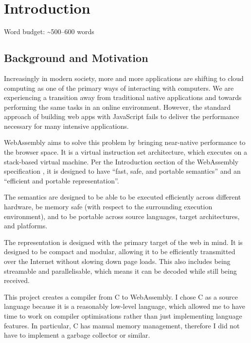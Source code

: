 \documentclass[00-main.tex]{subfiles}
\begin{document}
\chapter{Introduction}

\begin{mrwComment}
Word budget: \textasciitilde500--600 words
\end{mrwComment}

\section{Background and Motivation}

Increasingly in modern society, more and more applications are shifting to cloud computing as one of the primary ways of interacting with computers.
We are experiencing a transition away from traditional native applications and towards performing the same tasks in an online environment.
However, the standard approach of building web apps with JavaScript fails to deliver the performance necessary for many intensive applications.

WebAssembly aims to solve this problem by bringing near-native performance to the browser space.
It is a virtual instruction set architecture, which executes on a stack-based virtual machine.
Per the Introduction section of the WebAssembly specification , it is designed to have ``fast, safe, and portable semantics'' and an ``efficient and portable representation''.

The semantics are designed to be able to be executed efficiently across different hardware, be memory safe (with respect to the surrounding execution environment), and to be portable across source languages, target architectures, and platforms.

The representation is designed with the primary target of the web in mind.
It is designed to be compact and modular, allowing it to be efficiently transmitted over the Internet without slowing down page loads.
This also includes being streamable and parallelisable, which means it can be decoded while still being received.

This project creates a compiler from C to WebAssembly.
I chose C as a source language because it is a reasonably low-level language, which allowed me to have time to work on compiler optimisations rather than just implementing language features.
In particular, C has manual memory management, therefore I did not have to implement a garbage collector or similar.
\end{document}
